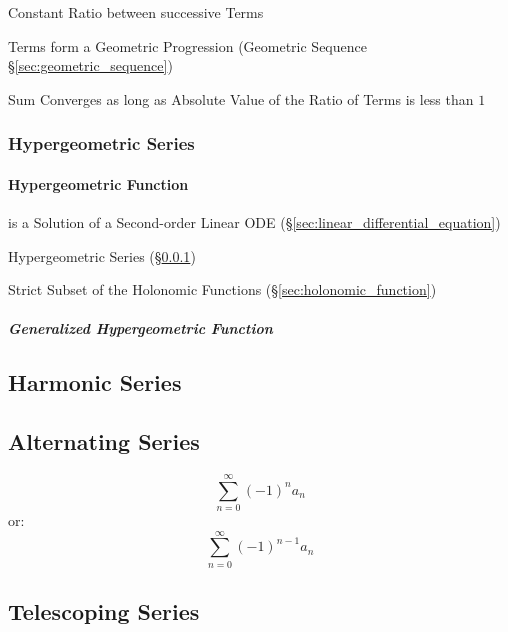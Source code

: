 Constant Ratio between successive Terms

Terms form a Geometric Progression (Geometric Sequence
\S\ref{sec:geometric_sequence})

Sum Converges as long as Absolute Value of the Ratio of Terms is less
than $1$



\subsubsection{Hypergeometric Series}\label{sec:hypergeometric_series}

\paragraph{Hypergeometric Function}\label{sec:hypergeometric_function}\hfill

is a Solution of a Second-order Linear ODE
(\S\ref{sec:linear_differential_equation})

Hypergeometric Series (\S\ref{sec:hypergeometric_series})

Strict Subset of the Holonomic Functions (\S\ref{sec:holonomic_function})



\subparagraph{Generalized Hypergeometric Function}
\label{sec:generalized_hypergeometric_function}\hfill



\subsection{Harmonic Series}\label{sec:harmonic_series}

\subsection{Alternating Series}\label{sec:alternating_series}

\[
  \sum_{n=0}^\infty (-1)^n a_n
\]
or:
\[
  \sum_{n=0}^\infty (-1)^{n-1} a_n
\]



\subsection{Telescoping Series}\label{sec:telescoping_series}

